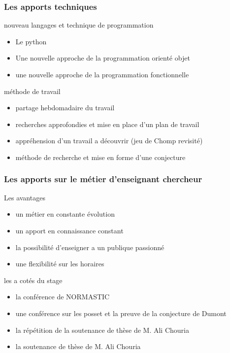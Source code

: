 \documentclass{beamer}
\begin{document}
  \begin{frame}
    \frametitle{Les apports techniques}
    
    \begin{block}{nouveau langages et technique de programmation}  
      \begin{itemize}
        \item Le python
        \item Une nouvelle approche de la programmation orienté objet
        \item une nouvelle approche de la programmation fonctionnelle
      \end{itemize}
    \end{block}
    \pause
    \begin{block}{méthode de travail}
      \begin{itemize}
        \item partage hebdomadaire du travail
        \item recherches approfondies et mise en place d'un plan de travail
        \item appréhension d'un travail a découvrir (jeu de Chomp revisité)
        \item méthode de recherche et mise en forme d'une conjecture
      \end{itemize}
    \end{block}
  \end{frame}

  \begin{frame}
    \frametitle{Les apports sur le métier d'enseignant chercheur}
    \begin{block}{Les avantages}
      \begin{itemize}
        \item un métier en constante évolution
        \item un apport en connaissance constant
        \item la possibilité d'enseigner a un publique passionné
        \item une flexibilité sur les horaires
      \end{itemize}
    \end{block}
    \pause
    \begin{block}{les a cotés du stage}
      \begin{itemize}
        \item la conférence de NORMASTIC
        \item une conférence sur les posset et la preuve de la conjecture de Dumont
        \item la répétition de la soutenance de thèse de M. Ali Chouria
        \item la soutenance de thèse de M. Ali Chouria
      \end{itemize}
    \end{block}
  \end{frame}
\end{document}
